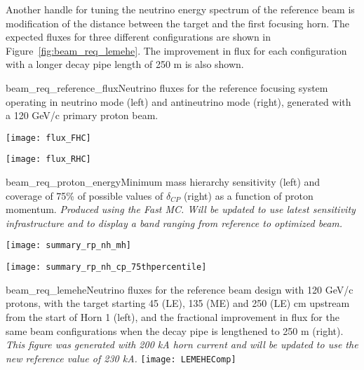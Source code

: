 Another handle for tuning the neutrino energy
spectrum of the reference beam is modification of the distance between
the target and the first focusing horn.  The expected fluxes for three
different configurations are shown in
Figure~\ref{fig:beam_req_lemehe}. The improvement in flux for each configuration with a longer decay pipe length of 250 m is also shown.

\begin{cdrfigure}{beam_req_reference_flux}{Neutrino fluxes for the reference 
    focusing system operating in neutrino mode (left) and antineutrino 
    mode (right), generated with a 120 GeV/c primary proton beam.} 
\centering 
\begin{minipage}{0.45\textwidth}
\centering 
\texttt{[image: flux\_FHC]}
\end{minipage}\hfill 
\begin{minipage}{0.45\textwidth}
\centering 
\texttt{[image: flux\_RHC]}
\end{minipage}
\end{cdrfigure}

\begin{cdrfigure}{beam_req_proton_energy}{Minimum mass hierarchy
    sensitivity (left) and 
    coverage of 75\% of possible values of $\delta_{CP}$ (right) as a
    function of proton momentum.  {\it Produced using the Fast MC.
      Will be updated to use latest sensitivity infrastructure and to
      display a band ranging from reference to optimized beam.}}
\centering 
\begin{minipage}{0.45\textwidth}
\centering 
\texttt{[image: summary\_rp\_nh\_mh]}
\end{minipage}\hfill 
\begin{minipage}{0.45\textwidth}
\centering 
\texttt{[image: summary\_rp\_nh\_cp\_75thpercentile]}
\end{minipage}
\end{cdrfigure}

\begin{cdrfigure} {beam_req_lemehe}{Neutrino fluxes for the 
    reference beam design with 120 GeV/c protons, with the target starting 45 (LE), 135 (ME) 
    and 250 (LE) cm upstream from the start of Horn 1 (left), and the 
   fractional improvement in flux for the same beam configurations 
    when the decay pipe is lengthened to 250 m (right). {\it This 
      figure was generated with 200 kA horn current and will be 
      updated to use the new reference value of 230 kA.}}
    \texttt{[image: LEMEHEComp]}
  \end{cdrfigure}

